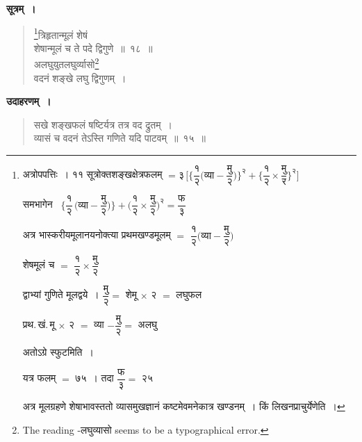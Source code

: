 \documentclass[11pt, openany]{book}
\begin{document}
 \textbf{सूत्रम्~।} 
\begin{quote}
    \bs 
    \footnote{अत्रोपपत्तिः~। ११ सूत्रोक्तशङ्खक्षेत्रफलम् $= \mbox{३}\,\Bigg[\bigg\{\dfrac{\mbox{१}}{\mbox{२}}\bigg(\mbox{व्या} - \dfrac{\mbox{मु}}{\mbox{२}}\bigg)\bigg\}^{\text{२}} + \bigg\{\dfrac{\mbox{१}}{\mbox{२}} \times \dfrac{\mbox{मु}}{\mbox{र}}\bigg\}^{\text{२}}\Bigg]$ 
\vspace{2mm}

\hspace{4mm} समभागेन~ $\Bigg\{\dfrac{\mbox{१}}{\mbox{२}}\,\bigg(\mbox{व्या} - \dfrac{\mbox{मु}}{\mbox{२}}\bigg)\Bigg\} + \bigg(\dfrac{\mbox{१}}{\mbox{२}} \times \dfrac{\mbox{मु}}{\mbox{२}}\bigg)^{\text{२}} = \dfrac{\mbox{फ}}{\mbox{३}}$ 
\vspace{2mm}

\hspace{4mm} अत्र भास्करीयमूलानयनोक्त्या प्रथमखण्डमूलम् $=$ $\dfrac{\mbox{१}}{\mbox{२}} \bigg(\mbox{व्या} - \dfrac{\mbox{मु}}{\mbox{२}}\bigg)$ 
\vspace{2mm}

\hspace{4mm} शेषमूलं च $=$ $\dfrac{\mbox{१}}{\mbox{२}} \times \dfrac{\mbox{मु}}{\mbox{२}}$ 
\vspace{2mm}

\hspace{4mm} द्वाभ्यां गुणिते मूलद्वये~। $\dfrac{\mbox{मु}}{\mbox{२}} =$ शेमू $\times$ २ $=$ लघुफल 
\vspace{2mm}

\hspace{4mm} प्रथ.\,खं.\,मू $\times$ २ $=$ व्या $- \dfrac{\mbox{मु}}{\mbox{२}} =$ अलघु 
\vspace{1mm}

\hspace{4mm} अतोऽग्रे स्फुटमिति~।  
\vspace{1mm}

\hspace{4mm} यत्र फलम् $=$ ७५~। तदा\; $\dfrac{\mbox{फ}}{\mbox{३}} =$ २५  
\vspace{2mm}

\hspace{4mm} अत्र मूलग्रहणे शेषाभावस्ततो व्यासमुखज्ञानं कष्टमेवमनेकात्र 
खण्डनम्~। किं लिखनप्राचुर्येणेति~। }त्रिहृतान्मूलं शेषं \\
शेषान्मूलं च ते पदे द्विगुणे~॥~१८~॥\\
अलघुयुतलघुर्व्यासो\footnote{The reading -लघुव्यासो seems to be a typographical error.} \\
वदनं शङ्खे लघु द्विगुणम्~।
\end{quote}
\newpage%
 \textbf{उदाहरणम्~।} 
\begin{quote}
    \bqt 
    सखे शङ्खफलं षष्टिर्यत्र तत्र वद द्रुतम्~।\\
व्यासं च वदनं तेऽस्ति गणिते यदि पाटवम्~॥~१५~॥
\end{quote}
\end{document}
